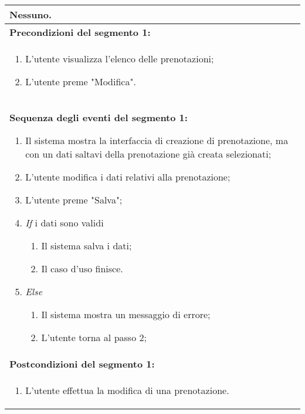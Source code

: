 \documentclass{article}
\begin{document}
\begin{table}[t]
\begin{tabular}{|p{\linewidth}|}
        Nessuno. \\
        \hline
        \cellcolor{gray!20}
        \textbf{Precondizioni del segmento 1:} \\
        \cellcolor{gray!20}
        \begin{minipage}{\linewidth}
            \begin{enumerate}[noitemsep]
                \item L'utente visualizza l'elenco delle prenotazioni;
                \item L'utente preme "Modifica".
            \end{enumerate}
        \end{minipage}
        \vspace{-5pt} \\
        \hline
        \textbf{Sequenza degli eventi del segmento 1:}
        \begin{enumerate}
            \item Il sistema mostra la interfaccia di creazione di prenotazione, ma con un dati saltavi della prenotazione già creata selezionati; %
            \item L'utente modifica i dati relativi alla prenotazione;
            \item L'utente preme "Salva";
            \item \textit{If} i dati sono validi
            \begin{enumerate}
                \item Il sistema salva i dati;
                \item Il caso d'uso finisce.
            \end{enumerate}
            \item \textit{Else}
            \begin{enumerate}
                \item Il sistema mostra un messaggio di errore;
                \item L'utente torna al passo 2;
            \end{enumerate}
        \end{enumerate} \\
        \hline
        \cellcolor{gray!20}
        \textbf{Postcondizioni del segmento 1:} \\
        \cellcolor{gray!20}
        \begin{minipage}{\linewidth}
            \begin{enumerate}[noitemsep]
                \item L'utente effettua la modifica di una prenotazione.
            \end{enumerate}
        \end{minipage} \\
        \hline
    \end{tabular}
\end{table}
\end{document}
